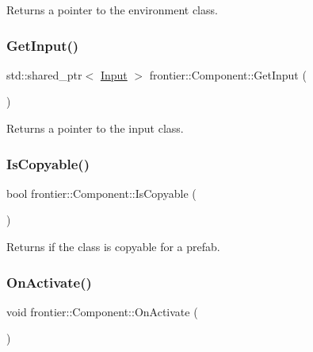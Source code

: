 Returns a pointer to the environment class. 

\mbox{\label{classfrontier_1_1_component_a25cc51fb97b0b4c5dad1401707d530ea}} 
\subsubsection{\texorpdfstring{Get\+Input()}{GetInput()}}
{\footnotesize\ttfamily std\+::shared\+\_\+ptr$<$ \hyperlink{classfrontier_1_1_input}{Input} $>$ frontier\+::\+Component\+::\+Get\+Input (\begin{DoxyParamCaption}{ }\end{DoxyParamCaption})\hspace{0.3cm}{\ttfamily [protected]}}



Returns a pointer to the input class. 

\mbox{\label{classfrontier_1_1_component_a22a2ac83f030cd83415a51f584cf2d32}} 
\subsubsection{\texorpdfstring{Is\+Copyable()}{IsCopyable()}}
{\footnotesize\ttfamily bool frontier\+::\+Component\+::\+Is\+Copyable (\begin{DoxyParamCaption}{ }\end{DoxyParamCaption})}



Returns if the class is copyable for a prefab. 

\mbox{\label{classfrontier_1_1_component_a77fca7ba1960aafb9bc05905e300c79d}} 
\subsubsection{\texorpdfstring{On\+Activate()}{OnActivate()}}
{\footnotesize\ttfamily void frontier\+::\+Component\+::\+On\+Activate (\begin{DoxyParamCaption}{ }\end{DoxyParamCaption})\hspace{0.3cm}{\ttfamily [virtual]}}



